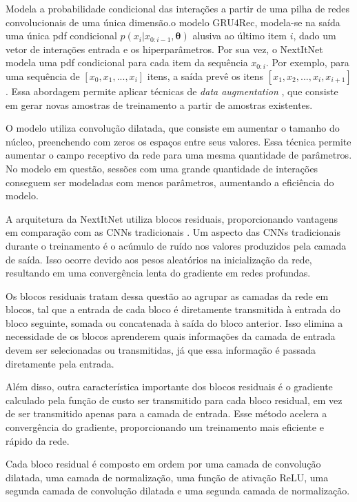 Modela a probabilidade condicional das interações a partir de uma pilha de redes
convolucionais de uma única dimensão.o modelo GRU4Rec, modela-se na
saída uma única pdf condicional $p(x_i|x_{0:i-1}, \mathbf{\theta})$ alusiva ao
último item $i$, dado um vetor de interações entrada e os hiperparâmetros. Por
sua vez, o NextItNet modela uma pdf condicional para cada item da sequência
$x_{0:i}$. Por exemplo, para uma sequência de $[x_0, x_1, ..., x_i]$ itens, a
saída prevê os itens $[x_1, x_2, ..., x_i, x_{i+1}]$. Essa abordagem permite
aplicar técnicas de \textit{data augmentation} \cite{tan2016improved}, que
consiste em gerar novas amostras de treinamento a partir de amostras existentes.

O modelo utiliza convolução dilatada, que consiste em aumentar o tamanho do
núcleo, preenchendo com zeros os espaços entre seus valores. Essa técnica
permite aumentar o campo receptivo da rede para uma mesma quantidade de
parâmetros. No modelo em questão, sessões com uma grande quantidade de
interações conseguem ser modeladas com menos parâmetros, aumentando a eficiência
do modelo.

A arquitetura da NextItNet utiliza blocos residuais, proporcionando vantagens em
comparação com as CNNs tradicionais \cite{he2016deep}. Um aspecto das CNNs
tradicionais durante o treinamento é o acúmulo de ruído nos valores produzidos
pela camada de saída. Isso ocorre devido aos pesos aleatórios na inicialização
da rede, resultando em uma convergência lenta do gradiente em redes profundas.

Os blocos residuais tratam dessa questão ao agrupar as camadas da rede em
blocos, tal que a entrada de cada bloco é diretamente transmitida à entrada do
bloco seguinte, somada ou concatenada à saída do bloco anterior. Isso elimina a
necessidade de os blocos aprenderem quais informações da camada de entrada devem
ser selecionadas ou transmitidas, já que essa informação é passada diretamente
pela entrada.

Além disso, outra característica importante dos blocos residuais é o gradiente
calculado pela função de custo ser transmitido para cada bloco residual, em vez
de ser transmitido apenas para a camada de entrada. Esse método acelera a
convergência do gradiente, proporcionando um treinamento mais eficiente e rápido
da rede.

Cada bloco residual é composto em ordem por uma camada de convolução dilatada,
uma camada de normalização, uma função de ativação ReLU, uma segunda camada de
convolução dilatada e uma segunda camada de normalização.

